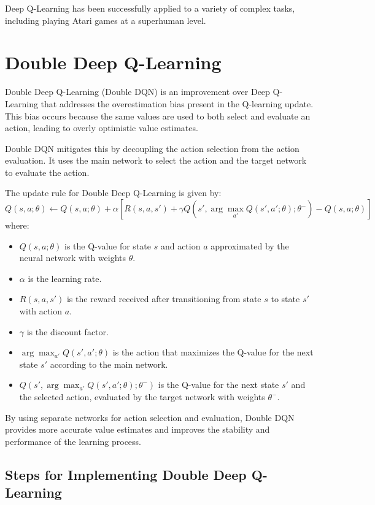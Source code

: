 \documentclass{article}
\begin{document}
Deep Q-Learning has been successfully applied to a variety of complex tasks, including playing Atari games at a superhuman level.

\section{Double Deep Q-Learning}

Double Deep Q-Learning (Double DQN) is an improvement over Deep Q-Learning that addresses the overestimation bias present in the Q-learning update. This bias occurs because the same values are used to both select and evaluate an action, leading to overly optimistic value estimates.

Double DQN mitigates this by decoupling the action selection from the action evaluation. It uses the main network to select the action and the target network to evaluate the action.

The update rule for Double Deep Q-Learning is given by:
\[ 
Q(s, a; \theta) \leftarrow Q(s, a; \theta) + \alpha \left[ R(s, a, s') + \gamma Q(s', \arg\max_{a'} Q(s', a'; \theta); \theta^-) - Q(s, a; \theta) \right]
\]
where:
\begin{itemize}
    \item \( Q(s, a; \theta) \) is the Q-value for state \( s \) and action \( a \) approximated by the neural network with weights \( \theta \).
    \item \( \alpha \) is the learning rate.
    \item \( R(s, a, s') \) is the reward received after transitioning from state \( s \) to state \( s' \) with action \( a \).
    \item \( \gamma \) is the discount factor.
    \item \( \arg\max_{a'} Q(s', a'; \theta) \) is the action that maximizes the Q-value for the next state \( s' \) according to the main network.
    \item \( Q(s', \arg\max_{a'} Q(s', a'; \theta); \theta^-) \) is the Q-value for the next state \( s' \) and the selected action, evaluated by the target network with weights \( \theta^- \).
\end{itemize}

By using separate networks for action selection and evaluation, Double DQN provides more accurate value estimates and improves the stability and performance of the learning process.

\subsection{Steps for Implementing Double Deep Q-Learning}
\end{document}
